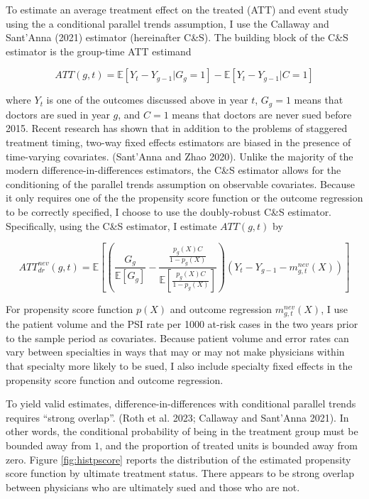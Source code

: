 \documentclass[
  12pt,
]{article}
\begin{document}
To estimate an average treatment effect on the treated (ATT) and event study using the a conditional parallel trends assumption, I use the Callaway and Sant'Anna (2021) estimator (hereinafter C\&S). The building block of the C\&S estimator is the group-time ATT estimand

\begin{equation}
ATT(g,t)=\mathbb{E}[Y_t-Y_{g-1}|G_g=1] - \mathbb{E}[Y_t-Y_{g-1}|C=1]
\label{eq:att-gt}
\end{equation}

\noindent
where \(Y_{t}\) is one of the outcomes discussed above in year \(t\), \(G_g=1\) means that doctors are sued in year \(g\), and \(C=1\) means that doctors are never sued before 2015. Recent research has shown that in addition to the problems of staggered treatment timing, two-way fixed effects estimators are biased in the presence of time-varying covariates. (Sant'Anna and Zhao 2020). Unlike the majority of the modern difference-in-differences estimators, the C\&S estimator allows for the conditioning of the parallel trends assumption on observable covariates. Because it only requires one of the the propensity score function or the outcome regression to be correctly specified, I choose to use the doubly-robust C\&S estimator. Specifically, using the C\&S estimator, I estimate \(ATT(g,t)\) by

\begin{equation}
ATT^{nev}_{dr}(g,t)=\mathbb{E}\left[ \left( \frac{G_g}{\mathbb{E}[G_g]}-\frac{\frac{p_g(X)C}{1-p_g(X)}}{\mathbb{E}\left[ \frac{p_g(X)C}{1-p_g(X)} \right]} \right) (Y_t-Y_{g-1}-m^{nev}_{g,t}(X)) \right]
\label{eq:dr-nvr}
\end{equation}

For propensity score function \(p(X)\) and outcome regression \(m^{nev}_{g,t}(X)\), I use the patient volume and the PSI rate per 1000 at-risk cases in the two years prior to the sample period as covariates. Because patient volume and error rates can vary between specialties in ways that may or may not make physicians within that specialty more likely to be sued, I also include specialty fixed effects in the propensity score function and outcome regression.

To yield valid estimates, difference-in-differences with conditional parallel trends requires ``strong overlap''. (Roth et al. 2023; Callaway and Sant'Anna 2021). In other words, the conditional probability of being in the treatment group must be bounded away from \(1\), and the proportion of treated units is bounded away from zero. Figure \ref{fig:histpscore} reports the distribution of the estimated propensity score function by ultimate treatment status. There appears to be strong overlap between physicians who are ultimately sued and those who are not.
\end{document}
